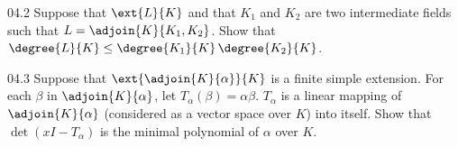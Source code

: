 \documentclass[11pt]{article}
\begin{document}
\begin{problem}{04.2}
  Suppose that $\ext{L}{K}$ and that $K_{1}$ and $K_{2}$ are two intermediate
  fields such that $L = \adjoin{K}{K_{1}, K_{2}}$. Show that
  $\degree{L}{K} \leq \degree{K_{1}}{K}\,\degree{K_{2}}{K}$.
\end{problem}

\begin{problem}{04.3}
  Suppose that $\ext{\adjoin{K}{\alpha}}{K}$ is a finite simple extension. For
  each $\beta$ in $\adjoin{K}{\alpha}$, let $T_{\alpha}(\beta) = \alpha\beta$.
  $T_{\alpha}$ is a linear mapping of $\adjoin{K}{\alpha}$ (considered as a
  vector space over $K$) into itself. Show that $\det(xI - T_{\alpha})$ is the
  minimal polynomial of $\alpha$ over $K$.
\end{problem}
\end{document}

